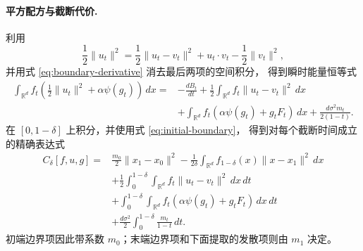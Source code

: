 \documentclass[UTF8,a4paper,11pt,fontset=fandol]{ctexart}
\begin{document}
\paragraph{平方配方与截断代价.}
利用
\begin{equation}
\frac12\|u_t\|^2
=\frac12\|u_t-v_t\|^2
+u_t\cdot v_t-\frac12\|v_t\|^2,
\end{equation}
并用式 \eqref{eq:boundary-derivative} 消去最后两项的空间积分，
得到瞬时能量恒等式
\begin{equation}
\begin{aligned}
\int_{\mathbb R^d}f_t
\left(\frac12\|u_t\|^2+\alpha\psi(g_t)\right)\,dx
={}&-\frac{dB_t}{dt}
+\frac12\int_{\mathbb R^d}f_t\|u_t-v_t\|^2\,dx\\
&+\int_{\mathbb R^d}
f_t\left(\alpha\psi(g_t)+g_tF_t\right)\,dx
+\frac{d\sigma^2m_t}{2(1-t)}.
\end{aligned}
\label{eq:instantaneous-identity}
\end{equation}
在 $[0,1-\delta]$ 上积分，并使用式 \eqref{eq:initial-boundary}，
得到对每个截断时间成立的精确表达式
\begin{equation}
\begin{aligned}
C_\delta[f,u,g]
={}&\frac{m_0}{2}\|x_1-x_0\|^2
-\frac1{2\delta}\int_{\mathbb R^d}
f_{1-\delta}(x)\|x-x_1\|^2\,dx\\
&+\frac12\int_0^{1-\delta}\int_{\mathbb R^d}
f_t\|u_t-v_t\|^2\,dx\,dt\\
&+\int_0^{1-\delta}\int_{\mathbb R^d}
f_t\left(\alpha\psi(g_t)+g_tF_t\right)\,dx\,dt\\
&+\frac{d\sigma^2}{2}\int_0^{1-\delta}\frac{m_t}{1-t}\,dt.
\end{aligned}
\label{eq:cutoff-identity}
\end{equation}
初端边界项因此带系数 $m_0$；末端边界项和下面提取的发散项则由 $m_1$ 决定。
\end{document}
